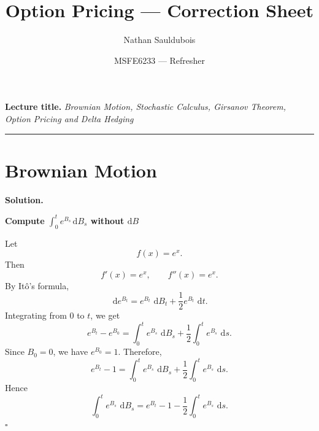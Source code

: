 \documentclass[11pt]{article}
\title{Option Pricing --- Correction Sheet}
\author{Nathan Sauldubois}
\date{MSFE6233 --- Refresher}
\theoremstyle{plain}
\newcommand{\dd}{\,\mathrm{d}}
\newcommand{\1}{\mathbf{1}}
\theoremstyle{definition}
\newenvironment{solution}
{\par\medskip\noindent\textbf{Solution.}\par\medskip}
{\hfill$\square$\par\medskip}
\begin{document}
\maketitle
\vspace{-1em}

\noindent\textbf{Lecture title.}
\emph{Brownian Motion, Stochastic Calculus, Girsanov Theorem, Option Pricing and Delta Hedging}

\vspace{0.5em}
\hrule
\vspace{1em}

\tableofcontents
\bigskip

\section{Brownian Motion}
\begin{solution} \noindent 
\textbf{Compute $\int_0^t e^{B_s}\,\mathrm{d} B_s$ without $\mathrm{d} B$}

\noindent Let
\[
f(x)=e^x.
\]
Then
\[
f'(x)=e^x,
\qquad
f''(x)=e^x.
\]
By It\^o's formula,
\[
\dd e^{B_t}
=
e^{B_t}\,\dd B_t
+
\frac12 e^{B_t}\,\dd t.
\]
Integrating from $0$ to $t$, we get
\[
e^{B_t}-e^{B_0}
=
\int_0^t e^{B_s}\,\dd B_s
+
\frac12\int_0^t e^{B_s}\,\dd s.
\]
Since $B_0=0$, we have $e^{B_0}=1$. Therefore,
\[
e^{B_t}-1
=
\int_0^t e^{B_s}\,\dd B_s
+
\frac12\int_0^t e^{B_s}\,\dd s.
\]
Hence
\[
\boxed{
\int_0^t e^{B_s}\,\dd B_s
=
e^{B_t}-1
-
\frac12\int_0^t e^{B_s}\,\dd s.
}
\]
\end{solution}

\end{document}
